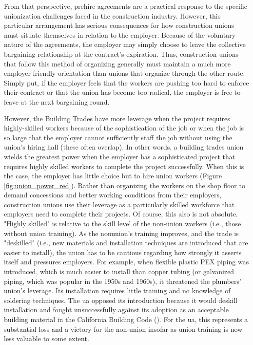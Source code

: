 \documentclass[12pt]{article}
\begin{document}
From that perspective, prehire agreements are a practical response to the specific unionization challenges faced in the construction industry. However, this particular arrangement has serious consequences for how construction unions must situate themselves in relation to the employer. Because of the voluntary nature of the agreements, the employer may simply choose to leave the collective bargaining relationship at the contract's expiration. Thus, construction unions that follow this method of organizing generally must maintain a much more employer-friendly orientation than unions that organize through the other route. Simply put, if the employer feels that the workers are pushing too hard to enforce their contract or that the union has become too radical, the employer is free to leave at the next bargaining round.

However, the Building Trades have more leverage when the project requires highly-skilled workers because of the sophistication of the job or when the job is so large that the employer cannot sufficiently staff the job without using the union's hiring hall (these often overlap). In other words, a building trades union wields the greatest power when the employer has a sophisticated project that requires highly skilled workers to complete the project successfully. When this is the case, the employer has little choice but to hire union workers (Figure \ref{fig:union_power_red}). Rather than organizing the workers on the shop floor to demand concessions and better working conditions from their employers, construction unions use their leverage as a particularly skilled workforce that employers need to complete their projects. Of course, this also is not absolute. "Highly skilled" is relative to the skill level of the non-union workers (i.e., those without union training). As the nonunion's training improves, and the trade is "deskilled" (i.e., new materials and installation techniques are introduced that are easier to install), the union has to be cautious regarding how strongly it asserts itself and pressures employers. For example, when flexible plastic PEX piping was introduced, which is much easier to install than copper tubing (or galvanized piping, which was popular in the 1950s and 1960s), it threatened the plumbers' union's leverage. Its installation requires little training and no knowledge of soldering techniques. The \acrfull{ua} opposed its introduction because it would deskill installation and fought unsuccessfully against its adoption as an acceptable building material in the California Building Code (\cite{faloonCaliforniaConsumerGroups2002, CaliforniaCaughtDebate2004}). For the \acrshort{ua}, this represents a substantial loss and a victory for the non-union insofar as union training is now less valuable to some extent.
\end{document}
